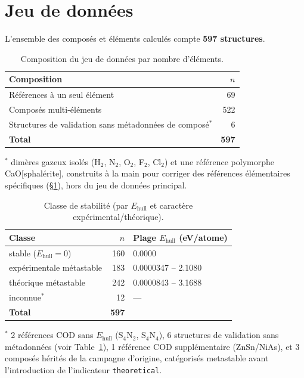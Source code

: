 \documentclass[11pt,a4paper]{article}
\begin{document}
\section{Jeu de données}
\label{sec:dataset}

L'ensemble des composés et éléments calculés compte \textbf{597
structures}.

\begin{table}[htbp]
\centering
\caption{Composition du jeu de données par nombre d'éléments.}
\label{tab:composition}
\begin{tabular}{@{}lr@{}}
\toprule
Composition & $n$ \\
\midrule
Références à un seul élément & 69 \\
Composés multi-éléments      & 522 \\
Structures de validation sans métadonnées de composé$^*$ & 6 \\
\midrule
\textbf{Total}                & \textbf{597} \\
\bottomrule
\end{tabular}

\vspace{0.15cm}
{\footnotesize $^*$ dimères gazeux isolés (H$_2$, N$_2$, O$_2$, F$_2$,
Cl$_2$) et une référence polymorphe CaO[sphalérite], construits à la
main pour corriger des références élémentaires spécifiques
(\S\ref{sec:dataset}), hors du jeu de données principal.}
\end{table}

\begin{table}[htbp]
\centering
\caption{Classe de stabilité (par $E_\text{hull}$ et caractère expérimental/théorique).}
\label{tab:stability}
\begin{tabular}{@{}lrl@{}}
\toprule
Classe & $n$ & Plage $E_\text{hull}$ (eV/atome) \\
\midrule
stable ($E_\text{hull}=0$)  & 160 & 0.0000 \\
expérimentale métastable    & 183 & 0.0000347 -- 2.1080 \\
théorique métastable        & 242 & 0.0000843 -- 3.1688 \\
inconnue$^*$ & 12 & --- \\
\midrule
\textbf{Total}               & \textbf{597} & \\
\bottomrule
\end{tabular}

\vspace{0.15cm}
{\footnotesize $^*$ 2 références COD sans $E_\text{hull}$ (S$_4$N$_2$,
S$_4$N$_4$), 6 structures de validation sans métadonnées (voir
Table~\ref{tab:composition}), 1 référence COD supplémentaire
(ZnSn/NiAs), et 3 composés hérités de la campagne d'origine, catégorisés
\og{}metastable\fg{} avant l'introduction de l'indicateur
\texttt{theoretical}.}
\end{table}
\end{document}
